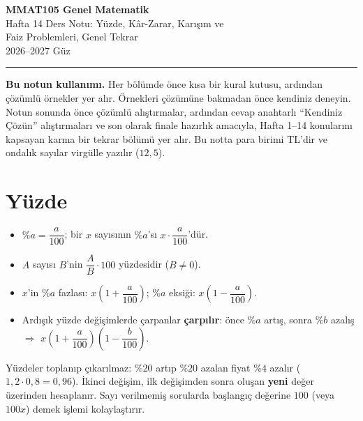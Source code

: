 \documentclass[11pt,a4paper]{article}
\begin{document}
\begin{minipage}[c]{\textwidth}
{\LARGE\bfseries\color{anamavi} MMAT105 Genel Matematik}\\[4pt]
{\large Hafta 14 Ders Notu: Yüzde, Kâr-Zarar, Karışım ve\\ Faiz Problemleri, Genel Tekrar}\\[6pt]
{\small 2026--2027 Güz}
\end{minipage}

\vspace{4pt}\noindent\textcolor{anamavi}{\rule{\textwidth}{1pt}}

\textbf{Bu notun kullanımı.} Her bölümde önce kısa bir kural kutusu, ardından çözümlü örnekler yer alır. Örnekleri çözümüne bakmadan önce kendiniz deneyin. Notun sonunda önce çözümlü alıştırmalar, ardından cevap anahtarlı ``Kendiniz Çözün'' alıştırmaları ve son olarak finale hazırlık amacıyla, Hafta 1--14 konularını kapsayan karma bir tekrar bölümü yer alır. Bu notta para birimi TL'dir ve ondalık sayılar virgülle yazılır (\(12{,}5\)).

\section{Yüzde}

\begin{kural}
\begin{itemize}[leftmargin=*,itemsep=1pt]
\item \(\%a=\dfrac{a}{100}\); \quad bir \(x\) sayısının \(\%a\)'sı \(x\cdot\dfrac{a}{100}\)'dür.
\item \(A\) sayısı \(B\)'nin \(\dfrac{A}{B}\cdot 100\) yüzdesidir (\(B\neq 0\)).
\item \(x\)'in \(\%a\) fazlası: \(x\left(1+\dfrac{a}{100}\right)\); \quad \(\%a\) eksiği: \(x\left(1-\dfrac{a}{100}\right)\).
\item Ardışık yüzde değişimlerde çarpanlar \textbf{çarpılır}: önce \(\%a\) artış, sonra \(\%b\) azalış \(\Rightarrow\) \(x\left(1+\dfrac{a}{100}\right)\left(1-\dfrac{b}{100}\right)\).
\end{itemize}
\end{kural}

\begin{dikkat}
Yüzdeler toplanıp çıkarılmaz: \(\%20\) artıp \(\%20\) azalan fiyat \(\%4\) azalır (\(1{,}2\cdot 0{,}8=0{,}96\)). İkinci değişim, ilk değişimden sonra oluşan \textbf{yeni} değer üzerinden hesaplanır. Sayı verilmemiş sorularda başlangıç değerine \(100\) (veya \(100x\)) demek işlemi kolaylaştırır.
\end{dikkat}
\end{document}
